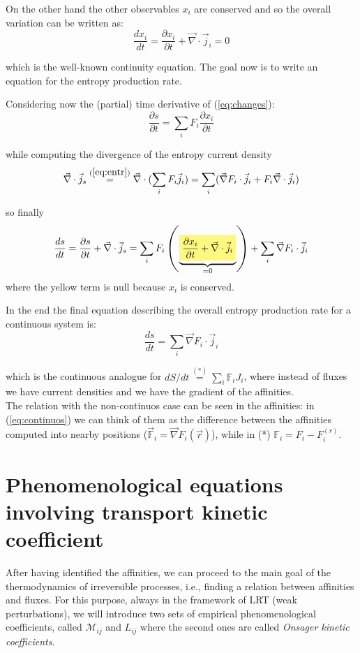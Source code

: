 \documentclass[\main/main.tex]{subfiles}
\begin{document}
On the other hand the other observables $x_i$ are conserved and so the overall variation can be written as:
\begin{equation}
    \frac{dx_i}{dt}=\frac{\partial x_{i}}{\partial t}+\Vec{\nabla} \cdot \vec{j}_{i}=0
    \label{eq:var}
\end{equation}

which is the well-known continuity equation. 
The goal now is to write an equation for the entropy production rate.

Considering now the (partial) time derivative of (\ref{eq:changes}):
\begin{equation}
    \frac{\partial s}{\partial t}=\sum_i F_i \frac{\partial x_i}{\partial t}
\end{equation}

while computing the divergence of the entropy current density
\begin{equation}
    \vec{\nabla}\cdot \vec{j}_s\overset{(\ref{eq:entr})}{=}\vec{\nabla}\cdot (\sum_i F_i\vec{j}_i)=\sum_i(\vec{\nabla}F_i\cdot\vec{j}_i+F_i\vec{\nabla}\cdot\vec{j}_i)
\end{equation}

so finally
\begin{equation}
     \frac{ds}{dt}={\frac{\partial s}{\partial t}}+\Vec{\nabla}\cdot \Vec{j}_s = \sum_i F_i \left(\underbrace{\hlc{yellow}{\frac{\partial x_{i}}{\partial t}+\Vec{\nabla} \cdot \vec{j}_{i}}}_{=0}\right)+\sum_i\vec{\nabla}F_i\cdot\vec{j}_i
\end{equation}
where the yellow term is null because $x_i$ is conserved.

In the end the final equation describing the overall entropy production rate for a continuous system is:
\begin{equation}
    \boxed{\frac{ds}{dt}=\sum_i\vec{\nabla}F_i\cdot\vec{j}_i}
    \label{eq:continuos}
\end{equation}

which is the continuous analogue for $dS/dt\overset{(*)}{=}\sum_i\mathbb{F}_iJ_i$, where instead of fluxes we have current densities and we have the gradient of the affinities. \\

The relation with the non-continuos case can be seen in the affinities: in (\ref{eq:continuos}) we can think of them as the difference between the affinities computed into nearby positions ($\vec{\mathbb{F}}_i=\vec{\nabla}F_i(\vec{r})$), while in (*) $\mathbb{F}_i=F_i-F_i^{(r)}$.

\section{Phenomenological equations involving transport kinetic coefficient}
After having identified the affinities, we can proceed to the main goal of the thermodynamics of irreversible processes, i.e., finding a relation between affinities and fluxes. For this
purpose, always in the framework of LRT (weak perturbations), we will introduce two sets of empirical phenomenological coefficients, called $\mathcal{M}_{ij}$ and $L_{ij}$ where the second ones are called \textit{Onsager kinetic coefficients}. \\
\end{document}
